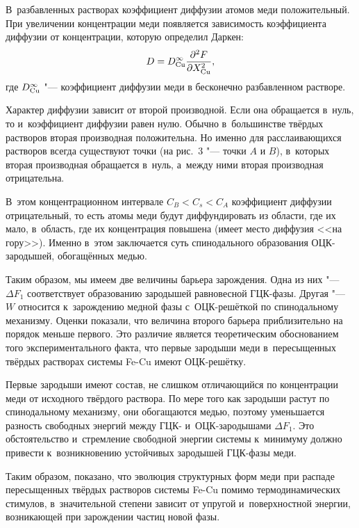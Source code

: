 В~разбавленных растворах коэффициент диффузии атомов меди положительный. 
При увеличении концентрации меди появляется зависимость коэффициента диффузии от концентрации, которую определил Даркен:
\begin{equation*}
D=D_{\rm Cu}^\infty \frac{\partial ^2F}{\partial X_{\rm Cu}^2 },
\end{equation*}
где $D_{\rm Cu}^\infty $ "--- коэффициент диффузии меди в бесконечно разбавленном растворе.

Характер диффузии зависит от второй производной. 
Если она обращается в~нуль, то и~коэффициент диффузии равен нулю. 
Обычно в~большинстве твёрдых растворов вторая производная положительна. 
Но именно для расслаивающихся растворов всегда существуют точки (на рис.~3 "--- точки $A$ и $B$), в~которых вторая производная обращается в~нуль, а~между ними вторая производная отрицательна. 

В~этом концентрационном интервале $C_B<C_{s}<C_A$ коэффициент диффузии отрицательный, то есть атомы меди будут диффундировать 
из области, где их мало, в~область, где их концентрация повышена (имеет место диффузия <<на гору>>). 
Именно в~этом заключается суть спинодального образования ОЦК-зародышей, обогащённых медью. 

Таким образом, мы имеем две величины барьера зарождения. Одна из них "--- $\Delta F_1$ соответствует образованию зародышей равновесной ГЦК-фазы. 
Другая "--- $W$ относится к~зарождению медной фазы с~ОЦК-решёткой по спинодальному механизму. 
Оценки показали, что величина второго барьера приблизительно на порядок меньше первого. 
Это различие является теоретическим обоснованием того экспериментального факта, что первые зародыши меди в~пересыщенных твёрдых растворах системы Fe-Cu имеют ОЦК-решётку.

Первые зародыши имеют состав, не слишком отличающийся по концентрации меди от исходного твёрдого раствора. 
По мере того как зародыши растут по спинодальному механизму, они обогащаются медью, поэтому уменьшается разность свободных энергий между
 ГЦК- и~ОЦК-зародышами $\Delta F_{1}$. 
Это обстоятельство и~стремление свободной энергии системы к~минимуму должно привести к~возникновению устойчивых зародышей ГЦК-фазы меди.

Таким образом, показано, что эволюция структурных форм меди при распаде пересыщенных твёрдых растворов системы Fe-Cu помимо термодинамических 
стимулов, в~значительной степени зависит от упругой и~поверхностной энергии, возникающей при зарождении частиц новой фазы. 

